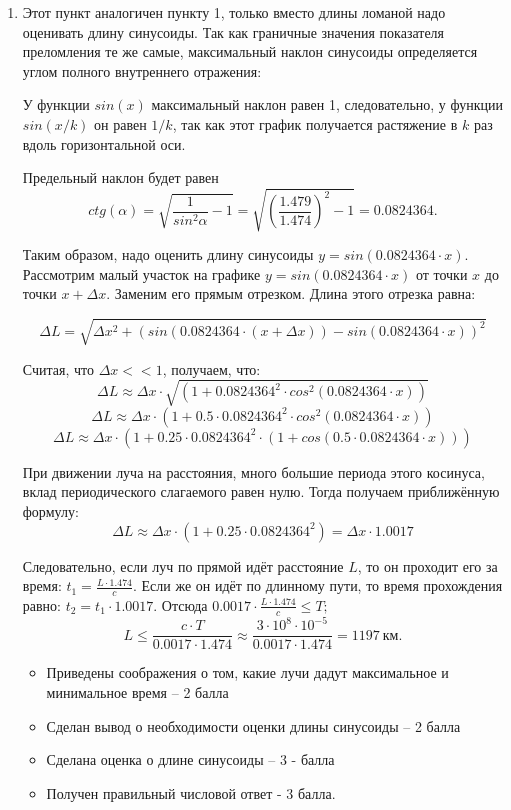 \begin{enumerate}
		\item Этот пункт аналогичен пункту 1, только вместо длины ломаной надо оценивать длину синусоиды. Так как граничные значения показателя преломления те же самые, максимальный наклон синусоиды определяется углом полного внутреннего отражения:
		

		У функции $sin(x)$ максимальный наклон равен 1, следовательно, у функции $sin(x/k)$ он равен $1/k$, так как этот график получается растяжение в $k$ раз вдоль горизонтальной оси.
		
		Предельный наклон будет равен $$ctg(\alpha)=\sqrt{\frac{1}{sin^2\alpha}-1}=\sqrt{\left(\frac{1.479}{1.474}\right)^2-1}=0.0824364.$$

		Таким образом, надо оценить длину синусоиды $y=sin(0.0824364 \cdot x)$. Рассмотрим малый участок на графике $y=sin(0.0824364 \cdot x)$ от точки $x$ до точки $x+ \Delta x$. Заменим его прямым отрезком. Длина этого отрезка равна:

		$$\Delta L=\sqrt{\Delta x^2+(sin(0.0824364 \cdot (x+\Delta x))-sin(0.0824364 \cdot x) )^2}$$ 
		
		Считая, что  $\Delta x << 1$, получаем, что: $$\Delta L \approx \Delta x \cdot \sqrt{(1+0.0824364^2 \cdot cos^2(0.0824364 \cdot x))}$$
		$$\Delta L \approx \Delta x \cdot (1+0.5 \cdot 0.0824364^2 \cdot cos^2(0.0824364 \cdot x) )$$
		$$\Delta L \approx \Delta x \cdot (1+0.25 \cdot 0.0824364^2 \cdot (1+cos(0.5 \cdot 0.0824364 \cdot x)))$$

		При движении луча на расстояния, много большие периода этого косинуса, вклад периодического слагаемого равен нулю. Тогда получаем приближённую формулу:
		$$\Delta L \approx \Delta x \cdot (1+0.25 \cdot 0.0824364^2 )=\Delta x \cdot 1.0017$$

		Следовательно, если луч по прямой идёт расстояние $L$, то он проходит его за время: $t_1=\frac{L \cdot 1.474}{c}$. Если же он идёт по длинному пути, то время прохождения равно: $t_2= t_1 \cdot 1.0017$. Отсюда $0.0017 \cdot \frac{L \cdot 1.474}{c} \leq T;$ $$L \leq \frac{c \cdot T}{0.0017 \cdot 1.474} \approx \frac{3 \cdot 10^8 \cdot 10^{-5}}{0.0017 \cdot 1.474}=1197 \: \text{км}.$$


		\markSection

		\begin{itemize}
			\item Приведены соображения о том, какие лучи дадут максимальное и минимальное время – 2 балла
			\item Сделан вывод о необходимости оценки длины синусоиды – 2 балла
			\item Сделана оценка о длине синусоиды – 3 - балла
			\item Получен правильный числовой ответ  - 3 балла.
		\end{itemize}
\end{enumerate}